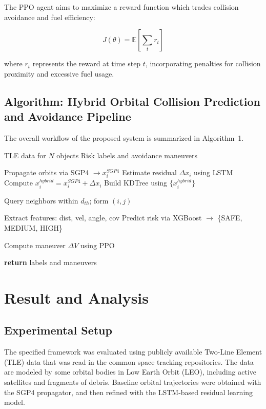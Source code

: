 \documentclass{ieeeaccess}
\begin{document}
The PPO agent aims to maximize a reward function which trades collision avoidance and fuel efficiency:

\begin{equation}
J(\theta) = \mathbb{E} \left[ \sum_{t} r_t \right]
\end{equation}

where $r_t$ represents the reward at time step $t$, incorporating penalties for collision proximity and excessive fuel usage.


\subsection{Algorithm: Hybrid Orbital Collision Prediction and Avoidance Pipeline}

The overall workflow of the proposed system is summarized in Algorithm~1.

\begin{algorithm}[!t]
\caption{Hybrid Orbital Collision Prediction and Avoidance Pipeline}
\label{alg:orbital}
\scriptsize
\setlength{\itemsep}{0pt}
\begin{algorithmic}[1]

\REQUIRE TLE data for $N$ objects
\ENSURE Risk labels and avoidance maneuvers

\STATE Propagate orbits via SGP4 $\rightarrow x_i^{SGP4}$
\STATE Estimate residual $\Delta x_i$ using LSTM
\STATE Compute $x_i^{hybrid} = x_i^{SGP4} + \Delta x_i$
\STATE Build KDTree using $\{x_i^{hybrid}\}$

    \STATE Query neighbors within $d_{th}$; form $(i,j)$
\ENDFOR

    \STATE Extract features: dist, vel, angle, cov
    \STATE Predict risk via XGBoost $\rightarrow$ \{SAFE, MEDIUM, HIGH\}
\ENDFOR

    \STATE Compute maneuver $\Delta V$ using PPO
\ENDFOR

\STATE \textbf{return} labels and maneuvers

\end{algorithmic}
\end{algorithm}

\section{Result and Analysis}
\subsection{Experimental Setup}
The specified framework was evaluated using publicly available Two-Line Element (TLE) data that was read in the common space tracking repositories. The data are modeled by some orbital bodies in Low Earth Orbit (LEO), including active satellites and fragments of debris. Baseline orbital trajectories were obtained with the SGP4 propagator, and then refined with the LSTM-based residual learning model.
\end{document}
